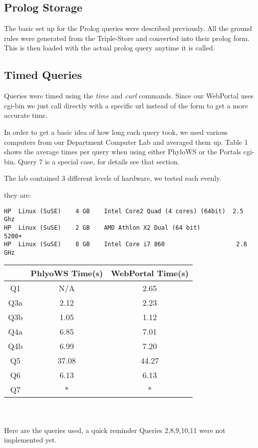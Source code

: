 \documentclass[10pt]{article}
\begin{document}
\subsection{Prolog Storage}

The basic set up for the Prolog queries were described previously.  All the
ground rules were generated from the Triple-Store and converted into their
prolog form.  This is then loaded with the actual prolog query anytime it is
called.

\subsection{Timed Queries}

Queries were timed using the \emph{time} and \emph{curl} commands.  Since our
WebPortal uses cgi-bin we just call directly with a specific url instead of the
form to get a more accurate time.

In order to get a basic idea of how long each query took, we used various
computers from our Department Computer Lab and averaged them up.  Table 1 shows
the average times per query when using either PhyloWS or the Portals cgi-bin.
Query 7 is a special case, for details see that section.

The lab contained 3 different levels of hardware, we tested each evenly.

they are:\begin{verbatim}
HP 	Linux (SuSE) 	4 GB 	Intel Core2 Quad (4 cores) (64bit) 	2.5 Ghz
HP 	Linux (SuSE) 	2 GB 	AMD Athlon X2 Dual (64 bit) 	       5200+
HP 	Linux (SuSE) 	8 GB 	Intel Core i7 860 	                 2.8 GHz
\end{verbatim}

\begin{tabular}{|c|c|c|}
\hline
        & PhlyoWS Time(s) & WebPortal Time(s) \\ \hline
Q1   &  N/A                &   2.65   \\ \hline
Q3a &  2.12                      & 2.23 \\ \hline
Q3b &  1.05                      & 1.12 \\ \hline
Q4a   & 6.85                       &7.01 \\ \hline
Q4b & 6.99               &  7.20\\ \hline
Q5   &  37.08                      & 44.27\\ \hline
Q6   & 6.13                       &6.13\\ \hline
Q7   &   *                     & *\\ \hline
\end{tabular}
\\
\\
Here are the queries used, a quick reminder Queries 2,8,9,10,11 were not implemented yet.
\end{document}
